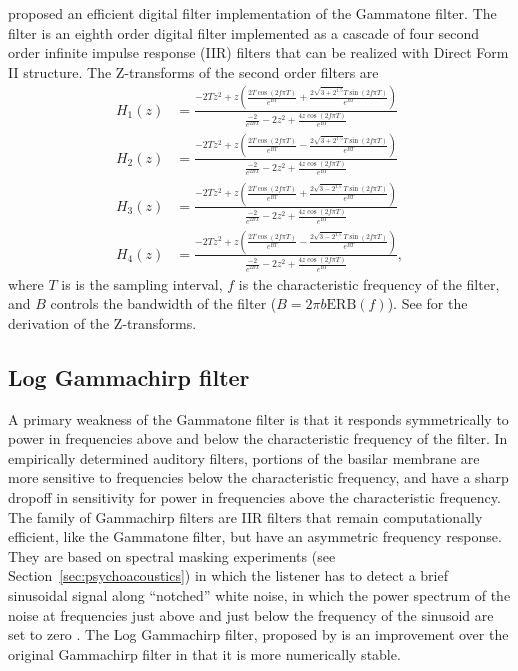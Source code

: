 
\cite{slaney1993} proposed an efficient
digital filter implementation
of the Gammatone filter.
The filter is an eighth order
digital filter
implemented as a cascade of four
second order infinite impulse response (IIR) filters
that can be realized
with Direct Form II structure.
The Z-transforms of the
second order filters are
\begin{align*}
  H_1(z) &= \frac{-2 T z^2 + z \left(
            \frac{2 T \cos(2 f \pi T)}{e^{BT}}
            + \frac{2 \sqrt{3 + 2^{1.5}} T \sin(2 f \pi T)}{e^{BT}}
           \right)}
           {\frac{-2}{e^{2BT}} - 2 z^2
           + \frac{4 z \cos(2 f \pi T)}{e^{BT}}} \\
  H_2(z) &= \frac{-2 T z^2 + z \left(
            \frac{2 T \cos(2 f \pi T)}{e^{BT}}
            - \frac{2 \sqrt{3 + 2^{1.5}} T \sin(2 f \pi T)}{e^{BT}}
           \right)}
           {\frac{-2}{e^{2BT}} - 2 z^2
           + \frac{4 z \cos(2 f \pi T)}{e^{BT}}} \\
  H_3(z) &= \frac{-2 T z^2 + z \left(
            \frac{2 T \cos(2 f \pi T)}{e^{BT}}
            + \frac{2 \sqrt{3 - 2^{1.5}} T \sin(2 f \pi T)}{e^{BT}}
           \right)}
           {\frac{-2}{e^{2BT}} - 2 z^2
           + \frac{4 z \cos(2 f \pi T)}{e^{BT}}} \\
  H_4(z) &= \frac{-2 T z^2 + z \left(
            \frac{2 T \cos(2 f \pi T)}{e^{BT}}
            - \frac{2 \sqrt{3 - 2^{1.5}} T \sin(2 f \pi T)}{e^{BT}}
           \right)}
           {\frac{-2}{e^{2BT}} - 2 z^2
           + \frac{4 z \cos(2 f \pi T)}{e^{BT}}},
\end{align*}
where $T$ is is the sampling interval,
$f$ is the characteristic frequency of the filter,
and $B$ controls the bandwidth of the filter
($B = 2 \pi b \text{ERB}(f)$).
See \cite{slaney1993} for the derivation
of the Z-transforms.

\subsection{Log Gammachirp filter}

A primary weakness of the Gammatone filter
is that it responds symmetrically
to power in frequencies above and below
the characteristic frequency of the filter.
In empirically determined auditory filters,
portions of the basilar membrane
are more sensitive to frequencies
below the characteristic frequency,
and have a sharp dropoff in sensitivity
for power in frequencies
above the characteristic frequency.
The family of Gammachirp filters
are IIR filters that remain
computationally efficient,
like the Gammatone filter,
but have an asymmetric frequency response.
They are based on spectral masking experiments
(see Section~\ref{sec:psychoacoustics})
in which the listener has to
detect a brief sinusoidal signal
along ``notched'' white noise,
in which the power spectrum of the noise
at frequencies just above and just below
the frequency of the sinusoid
are set to zero \cite{patterson1976}.
The Log Gammachirp filter,
proposed by \cite{unoki2001}
is an improvement over
the original Gammachirp filter
\cite{irion1997}
in that it is more numerically stable.


